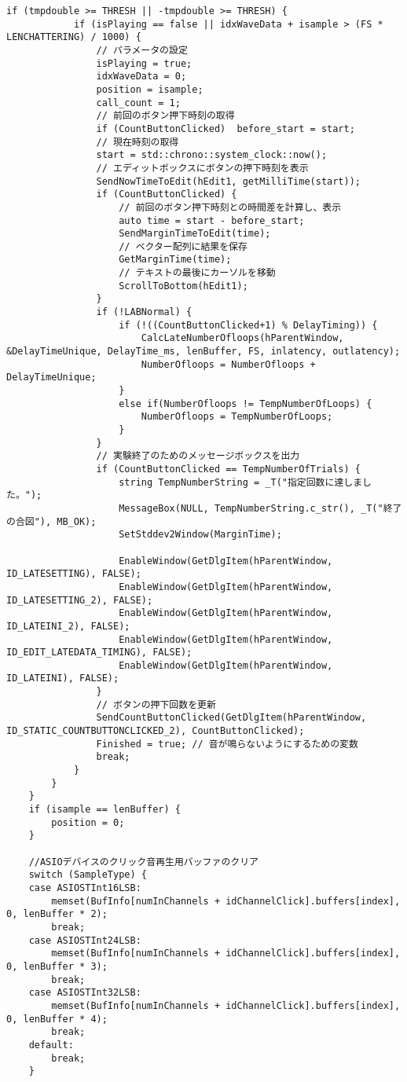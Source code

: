 \begin{lstlisting}[caption=main.cpp]
		if (tmpdouble >= THRESH || -tmpdouble >= THRESH) {
			if (isPlaying == false || idxWaveData + isample > (FS * LENCHATTERING) / 1000) {
				// パラメータの設定
				isPlaying = true;
				idxWaveData = 0;
				position = isample;
				call_count = 1;
				// 前回のボタン押下時刻の取得
				if (CountButtonClicked)  before_start = start;
				// 現在時刻の取得
				start = std::chrono::system_clock::now();
				// エディットボックスにボタンの押下時刻を表示
				SendNowTimeToEdit(hEdit1, getMilliTime(start));
				if (CountButtonClicked) {
					// 前回のボタン押下時刻との時間差を計算し、表示
					auto time = start - before_start;
					SendMarginTimeToEdit(time);
					// ベクター配列に結果を保存
					GetMarginTime(time);
					// テキストの最後にカーソルを移動
					ScrollToBottom(hEdit1);
				}
				if (!LABNormal) {
					if (!((CountButtonClicked+1) % DelayTiming)) {
						CalcLateNumberOfloops(hParentWindow, &DelayTimeUnique, DelayTime_ms, lenBuffer, FS, inlatency, outlatency);
						NumberOfloops = NumberOfloops + DelayTimeUnique;
					}
					else if(NumberOfloops != TempNumberOfLoops) {
						NumberOfloops = TempNumberOfLoops;
					}
				}
				// 実験終了のためのメッセージボックスを出力
				if (CountButtonClicked == TempNumberOfTrials) {
					string TempNumberString = _T("指定回数に達しました。");
					MessageBox(NULL, TempNumberString.c_str(), _T("終了の合図"), MB_OK);
					SetStddev2Window(MarginTime);                                                   
					
					EnableWindow(GetDlgItem(hParentWindow, ID_LATESETTING), FALSE);
					EnableWindow(GetDlgItem(hParentWindow, ID_LATESETTING_2), FALSE);
					EnableWindow(GetDlgItem(hParentWindow, ID_LATEINI_2), FALSE);
					EnableWindow(GetDlgItem(hParentWindow, ID_EDIT_LATEDATA_TIMING), FALSE);
					EnableWindow(GetDlgItem(hParentWindow, ID_LATEINI), FALSE);
				}
				// ボタンの押下回数を更新
				SendCountButtonClicked(GetDlgItem(hParentWindow, ID_STATIC_COUNTBUTTONCLICKED_2), CountButtonClicked);
				Finished = true; // 音が鳴らないようにするための変数
				break;
			}
		}
	}
	if (isample == lenBuffer) {
		position = 0;
	}

	//ASIOデバイスのクリック音再生用バッファのクリア
	switch (SampleType) {
	case ASIOSTInt16LSB:
		memset(BufInfo[numInChannels + idChannelClick].buffers[index], 0, lenBuffer * 2);
		break;
	case ASIOSTInt24LSB:
		memset(BufInfo[numInChannels + idChannelClick].buffers[index], 0, lenBuffer * 3);
		break;
	case ASIOSTInt32LSB:
		memset(BufInfo[numInChannels + idChannelClick].buffers[index], 0, lenBuffer * 4);
		break;
	default:
		break;
	}


\end{lstlisting}
